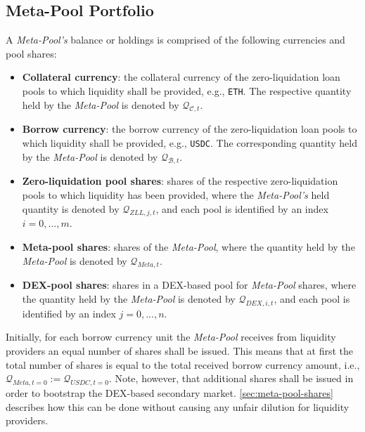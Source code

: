 \documentclass[a4paper]{article}
\begin{document}
\subsection{Meta-Pool Portfolio}
\label{sec:meta-pool-portfolio}
A \emph{Meta-Pool's} balance or holdings is comprised of the following currencies and pool shares:
\begin{itemize}
    \item \textbf{Collateral currency}: the collateral currency of the zero-liquidation loan pools to which liquidity shall be provided, e.g., \verb|ETH|. The respective quantity held by the \emph{Meta-Pool} is denoted by $\mathcal{Q}_{\mathcal{C}, t}$.
    \item \textbf{Borrow currency}: the borrow currency of the zero-liquidation loan pools to which liquidity shall be provided, e.g., \verb|USDC|. The corresponding quantity held by the \emph{Meta-Pool} is denoted by $\mathcal{Q}_{\mathcal{B}, t}$.
    \item \textbf{Zero-liquidation pool shares}: shares of the respective zero-liquidation pools to which liquidity has been provided, where the \emph{Meta-Pool's} held quantity is denoted by $\mathcal{Q}_{ZLL, j, t}$, and each pool is identified by an index $i=0,...,m$.
    \item \textbf{Meta-pool shares}: shares of the \emph{Meta-Pool}, where the quantity held by the \emph{Meta-Pool} is denoted by $\mathcal{Q}_{Meta, t}$.
    \item \textbf{DEX-pool shares}: shares in a DEX-based pool for \emph{Meta-Pool} shares, where the quantity held by the \emph{Meta-Pool} is denoted by $\mathcal{Q}_{DEX, i, t}$, and each pool is identified by an index $j=0,...,n$.
\end{itemize}

Initially, for each borrow currency unit the \emph{Meta-Pool} receives from liquidity providers an equal number of shares shall be issued. This means that at first the total number of shares is equal to the total received borrow currency amount, i.e., $\mathcal{Q}_{Meta, t=0} := \mathcal{Q}_{USDC, t=0}$. Note, however, that additional shares shall be issued in order to bootstrap the DEX-based secondary market. \cref{sec:meta-pool-shares} describes how this can be done without causing any unfair dilution for liquidity providers.\\
\end{document}
